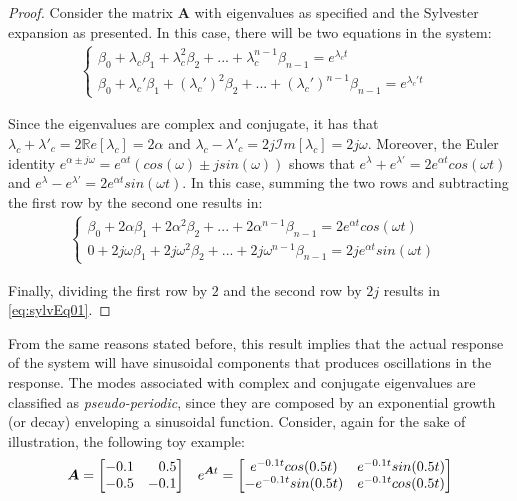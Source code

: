 \documentclass[a4paper,11pt]{book}
\numberwithin{figure}{chapter}
\numberwithin{equation}{chapter}
\numberwithin{table}{chapter}
\theoremstyle{definition}
\begin{document}
\begin{proof}
    Consider the matrix $\bm{A}$ with eigenvalues as specified and the Sylvester expansion as presented. In this case, there will be two equations in the system:
    \begin{align} 
    \begin{cases}
        \beta_0 + \lambda_c \beta_1 + \lambda_c^2  \beta_2 + ... + \lambda_c^{n-1} \beta_{n-1} = e^{\lambda_c t} & \\
        \beta_0 + \lambda_c' \beta_1 + (\lambda_c')^{2} \beta_2 + ... + (\lambda_c')^{n-1} \beta_{n-1} = e^{\lambda_c' t} &
    \end{cases}
    \end{align}
    
    Since the eigenvalues are complex and conjugate, it has that $\lambda_c + \lambda'_c = 2 \mathbb{R}e[\lambda_c] = 2 \alpha$ and $\lambda_c - \lambda'_c = 2j \mathcal{I}m[\lambda_c] = 2j \omega$. Moreover, the Euler identity $e^{\alpha \pm j \omega} = e^{\alpha t}(cos(\omega) \pm j sin(\omega))$ shows that $e^{\lambda} + e^{\lambda'} = 2 e^{\alpha t} cos(\omega t)$ and $e^{\lambda} - e^{\lambda'} = 2 e^{\alpha t} sin(\omega t)$. In this case, summing the two rows and subtracting the first row by the second one results in:
    \begin{align} 
    \begin{cases}
        \beta_0 + 2 \alpha \beta_1 + 2 \alpha^2  \beta_2 + ... + 2 \alpha^{n-1} \beta_{n-1} = 2 e^{\alpha t} cos(\omega t) & \\
        0 + 2j \omega \beta_1 + 2j \omega^{2} \beta_2 + ... + 2j \omega^{n-1} \beta_{n-1} = 2j e^{\alpha t} sin(\omega t) &
    \end{cases}
    \end{align}
    
    Finally, dividing the first row by $2$ and the second row by $2j$ results in \eqref{eq:sylvEq01}.
\end{proof}

From the same reasons stated before, this result implies that the actual response of the system will have sinusoidal components that produces oscillations in the response. The modes associated with complex and conjugate eigenvalues are classified as \textit{pseudo-periodic}, since they are composed by an exponential growth (or decay) enveloping a sinusoidal function. Consider, again for the sake of illustration, the following toy example:
\begin{align} \label{eq:stateRespEx02}
    \bm{A} = \begin{bmatrix} 
    	 -0.1  &  \hfill 0.5 \\
	    -0.5   &  -0.1 
    \end{bmatrix} && e^{\bm{A} t} = \begin{bmatrix} 
    	e^{-0.1 t} cos(0.5t)  &    e^{-0.1 t} sin(0.5t) \\
	    -e^{-0.1 t} sin(0.5t)  &  e^{-0.1 t} cos(0.5t)
    \end{bmatrix}
\end{align}
\end{document}
